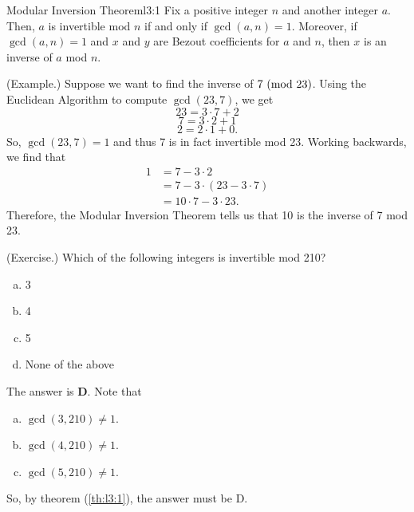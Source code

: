 \documentclass[letterpaper]{article}
\newcommand{\0}{\mathbf{0}}
\begin{document}
\begin{theorem}{Modular Inversion Theorem}{l3:1}
    Fix a positive integer $n$ and another integer $a$. Then, $a$ is invertible mod $n$ if and only if $\gcd(a, n) = 1$. Moreover, if $\gcd(a, n) = 1$ and $x$ and $y$ are Bezout coefficients for $a$ and $n$, then $x$ is an inverse of $a$ mod $n$. 
\end{theorem}

\begin{mdframed}
    (Example.) Suppose we want to find the inverse of $7 \ (\mathrm{mod}\ 23)$. Using the Euclidean Algorithm to compute $\gcd(23, 7)$, we get 
    \[23 = 3 \cdot 7 + 2\]
    \[7 = 3 \cdot 2 + 1\]
    \[2 = 2 \cdot 1 + 0.\]
    So, $\gcd(23, 7) = 1$ and thus 7 is in fact invertible mod 23. Working backwards, we find that 
    \begin{equation*}
        \begin{aligned}
            1 &= 7 - 3 \cdot 2 \\ 
                &= 7 - 3 \cdot (23 - 3 \cdot 7) \\ 
                &= 10 \cdot 7 - 3 \cdot 23.
        \end{aligned}
    \end{equation*}
    Therefore, the Modular Inversion Theorem tells us that 10 is the inverse of 7 mod 23. 
\end{mdframed}

\begin{mdframed}
    (Exercise.) Which of the following integers is invertible mod 210? 
    \begin{enumerate}[(a)]
        \item 3 
        \item 4
        \item 5
        \item None of the above 
    \end{enumerate}

    \begin{mdframed}
        The answer is \textbf{D}. Note that 
        \begin{enumerate}[(a)]
            \item $\gcd(3, 210) \neq 1$.
            \item $\gcd(4, 210) \neq 1$.
            \item $\gcd(5, 210) \neq 1$. 
        \end{enumerate} 
        So, by theorem (\ref{th:l3:1}), the answer must be D. 
    \end{mdframed}
\end{mdframed}
\end{document}
